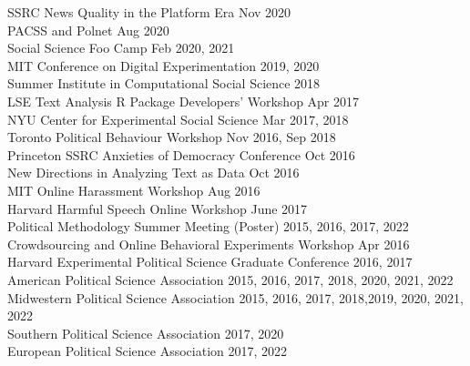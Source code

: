 \documentclass[margin]{res}
\begin{document}
{SSRC News Quality in the Platform Era \hfill Nov 2020\\
PACSS and Polnet \hfill Aug 2020\\
Social Science Foo Camp \hfill Feb 2020, 2021\\
MIT Conference on Digital Experimentation \hfill 2019, 2020\\
Summer Institute in Computational Social Science \hfill 2018\\
LSE Text Analysis R Package Developers' Workshop \hfill Apr 2017\\
NYU Center for Experimental Social Science \hfill Mar 2017, 2018\\
Toronto Political Behaviour Workshop \hfill Nov 2016, Sep 2018\\
Princeton SSRC Anxieties of Democracy Conference \hfill Oct 2016\\
New Directions in Analyzing Text as Data \hfill Oct 2016\\
MIT Online Harassment Workshop \hfill Aug 2016 \\		 
Harvard Harmful Speech Online Workshop \hfill June 2017 \\
Political Methodology Summer Meeting (Poster) \hfill 2015, 2016, 2017, 2022 \\		 
Crowdsourcing and Online Behavioral Experiments Workshop  \hfill Apr 2016 \\		 
Harvard Experimental Political Science Graduate Conference \hfill 2016, 2017\\
American Political Science Association \hfill 2015, 2016, 2017, 2018, 2020, 2021, 2022 \\		 
Midwestern Political Science Association \hfill 2015, 2016, 2017, 2018,2019, 2020, 2021, 2022\\
Southern Political Science Association \hfill 2017, 2020 \\		 
European Political Science Association \hfill 2017, 2022


}
\end{document}

